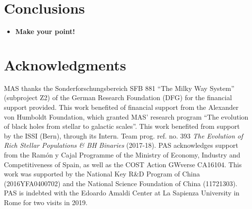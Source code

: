 \documentclass[useAMS,usenatbib]{mn2e}
\begin{document}
\section{Conclusions}

\begin{itemize}
\item {\bf Make your point!}
\end{itemize}

\section*{Acknowledgments}

MAS thanks the Sonderforschungsbereich SFB 881 ``The Milky Way System''
(subproject Z2) of the German Research Foundation (DFG) for the financial
support provided. This work benefited of financial support from the Alexander
von Humboldt Foundation, which granted MAS' research program ``The evolution of
black holes from stellar to galactic scales''.  This work benefited from
support by the ISSI (Bern), through its Intern. Team prog. ref. no. 393 {\it
The Evolution of Rich Stellar Populations \& BH Binaries} (2017-18).  PAS
acknowledges support from the Ram{\'o}n y Cajal Programme of the Ministry of
Economy, Industry and Competitiveness of Spain, as well as the COST Action
GWverse CA16104. This work was supported by the National Key R\&D Program of
China (2016YFA0400702) and the National Science Foundation of China (11721303).
PAS is indebted with the Edoardo Amaldi Center at La Sapienza University in
Rome for two visits in 2019.


\label{LastPage}
\end{document}
